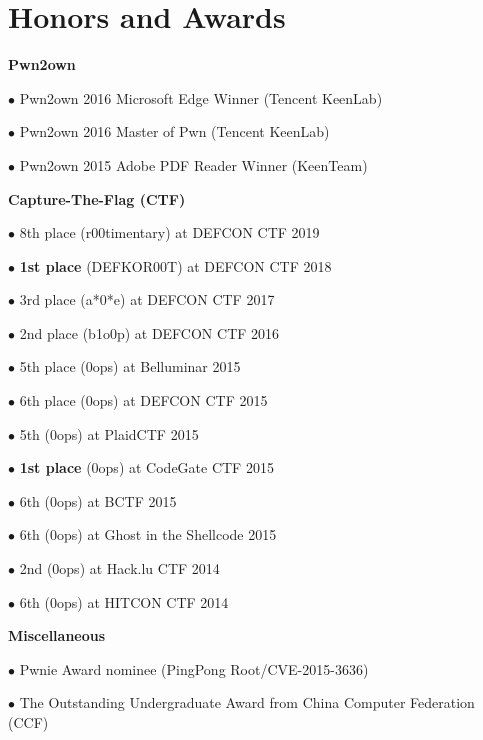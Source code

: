 \section*{Honors and Awards}
\begin{description}
\item{\bf {Pwn2own}}
	\item $\bullet$ Pwn2own 2016 Microsoft Edge Winner (Tencent KeenLab) 
	\item $\bullet$ Pwn2own 2016 Master of Pwn (Tencent KeenLab) 
	\item $\bullet$ Pwn2own 2015 Adobe PDF Reader Winner (KeenTeam) 
\item{\bf {Capture-The-Flag (CTF)}}
	\item $\bullet$ 8th place (r00timentary) at DEFCON CTF 2019 
	\item $\bullet$ \textbf{1st place} (DEFKOR00T) at DEFCON CTF 2018 
	\item $\bullet$ 3rd place (a*0*e) at DEFCON CTF 2017 
	\item $\bullet$ 2nd place (b1o0p) at DEFCON CTF 2016 
	\item $\bullet$ 5th place (0ops) at Belluminar 2015 
	\item $\bullet$ 6th place (0ops) at DEFCON CTF 2015 
	\item $\bullet$ 5th (0ops) at PlaidCTF 2015 
	\item $\bullet$ \textbf{1st place} (0ops) at CodeGate CTF 2015 
	\item $\bullet$ 6th (0ops) at BCTF 2015 
	\item $\bullet$ 6th (0ops) at Ghost in the Shellcode 2015 
	\item $\bullet$ 2nd (0ops) at Hack.lu CTF 2014 
	\item $\bullet$ 6th (0ops) at HITCON CTF 2014 
\item{\bf {Miscellaneous}}
	\item $\bullet$ Pwnie Award nominee (PingPong Root/CVE-2015-3636) 
	\item $\bullet$ The Outstanding Undergraduate Award from China Computer Federation (CCF) 
\end{description}
